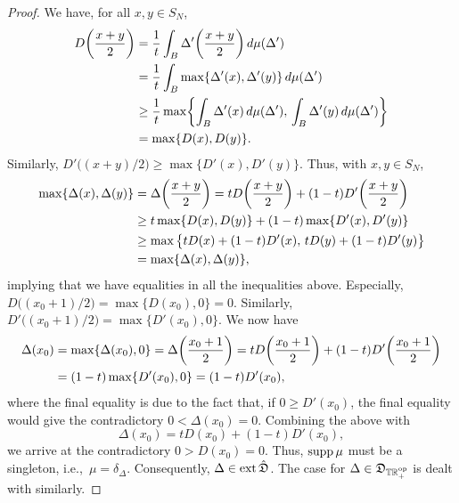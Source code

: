 \documentclass[12pt,a4paper,reqno]{amsart}
\theoremstyle{definition}
\newcommand{\mf}[1]{\mathfrak{#1}}
\newcommand{\R}{\mathbb R}
\newcommand{\T}{\mathbb T}
\let\originalleft\left
\let\originalright\right
\renewcommand{\left}{\mathopen{}\mathclose\bgroup\originalleft}
\renewcommand{\right}{\aftergroup\egroup\originalright}
\begin{document}
\begin{proof}
We have, for all $x,y\in S_N$,
\begin{align*}
D\left(\frac{x+y}{2}\right)&=\frac{1}{t}\int_B \Delta'\left(\frac{x+y}{2}\right)\,d\mu(\Delta')\\
&=\frac{1}{t}\int_B \max\{\Delta'(x),\Delta'(y)\}\,d\mu(\Delta')\\
&\geq\frac{1}{t}\max\left\{\int_B \Delta'(x)\,d\mu(\Delta'),\,\int_B \Delta'(y)\,d\mu(\Delta')\right\}\\
&=\max\{D(x),D(y)\}.
\end{align*}
Similarly, $D'\big((x+y)/2\big)\geq\max\{D'(x),D'(y)\}$. Thus, with $x,y\in S_N$,
\begin{align*}
\max\{\Delta(x),\Delta(y)\}&=\Delta\left(\frac{x+y}{2}\right)=tD\left(\frac{x+y}{2}\right)+(1-t)D'\left(\frac{x+y}{2}\right)\\
&\geq t\max\{D(x),D(y)\}+(1-t)\max\{D'(x),D'(y)\}\\
&\geq \max\big\{tD(x)+(1-t)D'(x),\,tD(y)+(1-t)D'(y)\big\}\\
&=\max\{\Delta(x),\Delta(y)\},
\end{align*}
implying that we have equalities in all the inequalities above. Especially, $D\big((x_0+1)/2\big)=\max\{D(x_0),0\}=0$. Similarly, $D'\big((x_0+1)/2\big)=\max\{D'(x_0),0\}$. We now have
\begin{align*}
\Delta(x_0)&=\max\{\Delta(x_0),0\}=\Delta\left(\frac{x_0+1}{2}\right)=tD\left(\frac{x_0+1}{2}\right)+(1-t)D'\left(\frac{x_0+1}{2}\right)\\
&=(1-t)\max\{D'(x_0),0\}=(1-t)D'(x_0),
\end{align*}
where the final equality is due to the fact that, if $0\geq D'(x_0)$, the final equality would give the contradictory $0<\Delta(x_0)=0$. Combining the above with
$$
\Delta(x_0)=tD(x_0)+(1-t)D'(x_0),
$$
we arrive at the contradictory $0>D(x_0)=0$. Thus, ${\rm supp}\,\mu$ must be a singleton, i.e.,\ $\mu=\delta_\Delta$. Consequently, $\Delta\in{\rm ext}\,\hat{\mf D}$. The case for $\Delta\in\mf D_{\T\R_+^{\rm op}}$ is dealt with similarly.

\end{proof}
\end{document}
